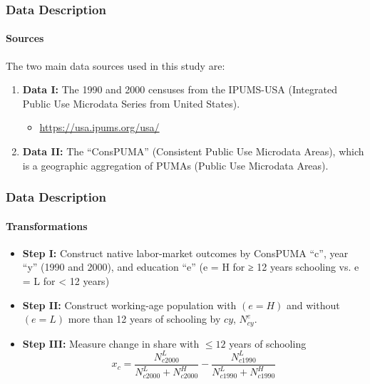 
\begin{frame}
    \frametitle{Data Description}
    \framesubtitle{Sources}

    The two main data sources used in this study are:
    \begin{enumerate}
        \item \textbf{Data I:} The 1990 and 2000 censuses from the IPUMS-USA (Integrated Public Use Microdata Series from United States).
        \begin{itemize}
            \item \url{https://usa.ipums.org/usa/}
        \end{itemize}
        \item \textbf{Data II:} The “ConsPUMA” (Consistent Public Use Microdata Areas), which is a geographic aggregation of PUMAs (Public Use Microdata Areas).
    \end{enumerate}

\end{frame}

\begin{frame}
    \frametitle{Data Description}
    \framesubtitle{Transformations}

    \begin{itemize}
        \item \textbf{Step I:} Construct native labor-market outcomes by ConsPUMA “c”, year “y” (1990 and 2000), and education “e” (e = H for ≥ 12 years schooling vs. e = L for < 12 years)
    \end{itemize}
    \begin{itemize}
        \item \textbf{Step II:} Construct working-age population with $(e = H)$ and without $(e = L)$ more than 12 years of schooling by $cy$, $N^e_{cy}$.
    \end{itemize}
    \begin{itemize}
        \item \textbf{Step III:} Measure change in share with $\leq 12$ years of schooling
        \[x_c = \frac{N^L_{c2000}}{N^L_{c2000} + N^H_{c2000}} - \frac{N^L_{c1990}}{N^L_{c1990} + N^H_{c1990}}\]
    \end{itemize}

\end{frame}


